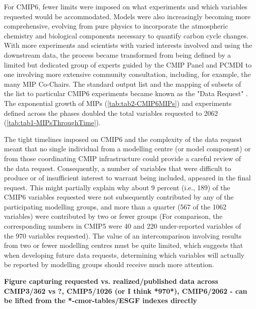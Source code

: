 \documentclass[gmd, preprint]{copernicus}
\def\cred#1{{\color{red}#1}}
\begin{document}
For CMIP6, fewer limits were imposed on what experiments and which variables requested would be accommodated. Models were also increasingly becoming more comprehensive, evolving from pure physics to incorporate the atmospheric chemistry and biological components necessary to quantify carbon cycle changes. With more experiments and scientists with varied interests involved and using the downstream data, the process became transformed from being defined by a limited but dedicated group of experts guided by the CMIP Panel and PCMDI to one involving more extensive community consultation, including, for example, the many MIP Co-Chairs. The standard output list and the mapping of subsets of the list to particular CMIP6 experiments became known as the "Data Request" \citep{juckes_cmip6_2020}. The exponential growth of MIPs (\autoref{tab:tab2-CMIP6MIPs}) and experiments defined across the phases doubled the total variables requested to 2062 (\autoref{tab:tab1-MIPsThroughTime}). 

The tight timelines imposed on CMIP6 and the complexity of the data request meant that no single individual from a modelling centre (or model component) or from those coordinating CMIP infrastructure could provide a careful review of the data request. Consequently, a number of variables that were difficult to produce or of insufficient interest to warrant being included, appeared in the final request. This might partially explain why about 9 percent (i.e., 189) of the CMIP6 variables requested were not subsequently contributed by any of the participating modelling groups, and more than a quarter (567 of the 1062 variables) were contributed by two or fewer groups (For comparison, the corresponding numbers in CMIP5 were 40 and 220 under-reported variables of the 970 variables requested). The value of an intercomparison involving results from two or fewer modelling centres must be quite limited, which suggests that when developing future data requests, determining which variables will actually be reported by modelling groups should receive much more attention. 

\cred{\textbf{Figure capturing requested vs. realized/published data across CMIP3/362 vs ?, CMIP5/1026 (or I think *970*), CMIP6/2062 - can be lifted from the *-cmor-tables/ESGF indexes directly}}
\end{document}
